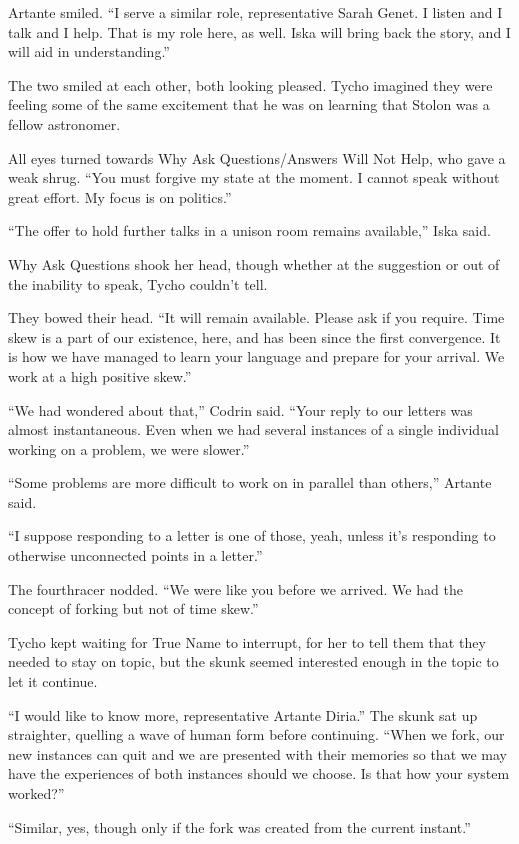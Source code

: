 Artante smiled. ``I serve a similar role, representative Sarah Genet. I listen and I talk and I help. That is my role here, as well. Iska will bring back the story, and I will aid in understanding.''

The two smiled at each other, both looking pleased. Tycho imagined they were feeling some of the same excitement that he was on learning that Stolon was a fellow astronomer.

All eyes turned towards Why Ask Questions/Answers Will Not Help, who gave a weak shrug. ``You must forgive my state at the moment. I cannot speak without great effort. My focus is on politics.''

``The offer to hold further talks in a unison room remains available,'' Iska said.

Why Ask Questions shook her head, though whether at the suggestion or out of the inability to speak, Tycho couldn't tell.

They bowed their head. ``It will remain available. Please ask if you require. Time skew is a part of our existence, here, and has been since the first convergence. It is how we have managed to learn your language and prepare for your arrival. We work at a high positive skew.''

``We had wondered about that,'' Codrin said. ``Your reply to our letters was almost instantaneous. Even when we had several instances of a single individual working on a problem, we were slower.''

``Some problems are more difficult to work on in parallel than others,'' Artante said.

``I suppose responding to a letter is one of those, yeah, unless it's responding to otherwise unconnected points in a letter.''

The fourthracer nodded. ``We were like you before we arrived. We had the concept of forking but not of time skew.''

Tycho kept waiting for True Name to interrupt, for her to tell them that they needed to stay on topic, but the skunk seemed interested enough in the topic to let it continue.

``I would like to know more, representative Artante Diria.'' The skunk sat up straighter, quelling a wave of human form before continuing. ``When we fork, our new instances can quit and we are presented with their memories so that we may have the experiences of both instances should we choose. Is that how your system worked?''

``Similar, yes, though only if the fork was created from the current instant.''

